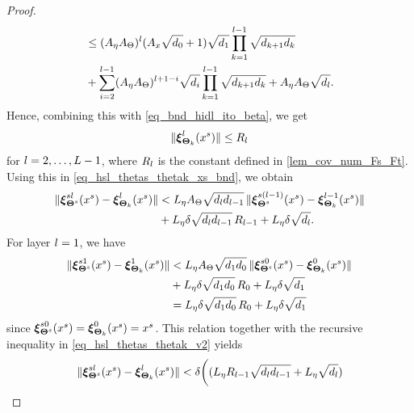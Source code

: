 \documentclass[review,supplement,onefignum,onetabnum]{siamonline250211}
\begin{document}
\begin{proof}
\begin{equation*}
\begin{split}
&\leq 
({A_\eta} {A_\Theta}) ^l  ({A_x} \sqrt{{d_0}}+1) \sqrt{{d_1}}
\prod_{k=1}^{l-1} \sqrt{{d_{k+1}} {d_k}} \\
&+
\sum_{i=2}^{l-1} ({A_\eta} {A_\Theta})^{l+1-i} \sqrt{{d_i}}
\prod_{k=1}^{l-1} \sqrt{{d_{k+1}} {d_k}}
+
{A_\eta} {A_\Theta} \sqrt{{d_l}}.
\end{split}
\end{equation*}
%
Hence, combining this with \eqref{eq_bnd_hidl_ito_beta}, we get 
%
\begin{equation}
\label{eq_bnd_norm_Rl}
\begin{split}
\|  \boldsymbol{\xi}^{l}_{\boldsymbol{\Theta}_k}(x^s) \|  \leq {R_l}
\end{split}
\end{equation}
%
for $l=2, \dots, L-1 $, where ${R_l}$ is the constant defined in \cref{lem_cov_num_Fs_Ft}. Using this in \eqref{eq_hsl_thetas_thetak_xs_bnd}, we obtain
%
\begin{equation}
\label{eq_hsl_thetas_thetak_v2}
\begin{split}
\| \boldsymbol{\xi}^{sl}_{\boldsymbol{\Theta}^{s}}(x^s) - \boldsymbol{\xi}^{l}_{\boldsymbol{\Theta}_k}(x^s)  \|   
&< 
 {L_\eta} 
 {A_\Theta} \sqrt{{d_l} {d_{l-1}}} \,  \|   \boldsymbol{\xi}^{s(l-1)}_{\boldsymbol{\Theta}^{s}}(x^s)  - \boldsymbol{\xi}^{l-1}_{\boldsymbol{\Theta}_k}(x^s)  \| \\
 &+{L_\eta}
 \delta \sqrt{{d_l} {d_{l-1}}} \, {R_{l-1}} 
 +{L_\eta}
 \delta \sqrt{{d_l}}.
\end{split}
\end{equation}
%
For layer $l=1$, we have
%
\begin{equation*}
\begin{split}
\| \boldsymbol{\xi}^{s1}_{\boldsymbol{\Theta}^{s}}(x^s) - \boldsymbol{\xi}^{1}_{\boldsymbol{\Theta}_k}(x^s)  \|   
&< 
{L_\eta} 
 {A_\Theta} \sqrt{{d_1} {d_0}} \,  \|   \boldsymbol{\xi}^{s0}_{\boldsymbol{\Theta}^{s}}(x^s)  - \boldsymbol{\xi}^{0}_{\boldsymbol{\Theta}_k}(x^s)  \| \\
 &+{L_\eta}
 \delta \sqrt{{d_1} {d_0}} \, {R_0} 
 +{L_\eta}
 \delta \sqrt{{d_1}}\\
 &={L_\eta}
 \delta \sqrt{{d_1} {d_0}} \, {R_0} 
 +{L_\eta}
 \delta \sqrt{{d_1}} 
\end{split}
\end{equation*}
%
since $ \boldsymbol{\xi}^{s0}_{\boldsymbol{\Theta}^{s}}(x^s)  = \boldsymbol{\xi}^{0}_{\boldsymbol{\Theta}_k}(x^s) = x^s$. This relation together with the recursive inequality in \eqref{eq_hsl_thetas_thetak_v2} yields
%
\begin{equation}
\label{eq_bnd_norm_Ql_delta}
\begin{split}
\| \hsl_{\Thetas}(\xs) - \hidl_{\boldsymbol{\Theta}_k}(\xs)  \|   
&< \radTheta 
\bigg(
(\Leta \Bdimlm \sqrt{\dl \dlm}+ \Leta \sqrt{\dl}) \\

\end{split}
\end{equation}
\end{proof}
\end{document}
